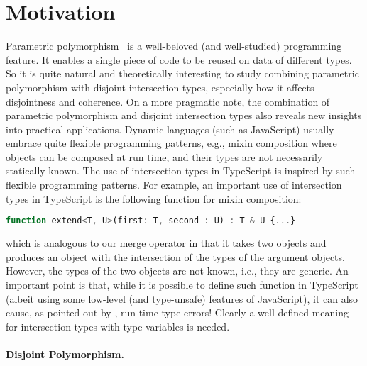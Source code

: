 
\section{Motivation}

Parametric polymorphism~\citep{reynolds1983types} is a well-beloved (and
well-studied) programming feature. It enables a single piece of code to be
reused on data of different types. So it is quite natural and theoretically
interesting to study combining parametric polymorphism with disjoint
intersection types, especially how it affects disjointness and coherence. On a more
pragmatic note, the combination of parametric polymorphism and disjoint intersection types also reveals new
insights into practical applications. Dynamic languages (such as JavaScript)
usually embrace quite flexible programming patterns, e.g., mixin composition
where objects can be composed at run time, and their types are not necessarily
statically known. The use of intersection types in TypeScript is inspired by
such flexible programming patterns. For example, an important use of
intersection types in TypeScript is the following function for mixin
composition:
\begin{lstlisting}[language=JavaScript]
function extend<T, U>(first: T, second : U) : T & U {...}
\end{lstlisting}
which is analogous to our merge operator in that it takes two objects and
produces an object with the intersection of the types of the argument objects.
However, the types of the two objects are not known, i.e., they are generic. An
important point is that, while it is possible to define such function in
TypeScript (albeit using some low-level (and type-unsafe) features of
JavaScript), it can also cause, as pointed out by \citet{alpuimdisjoint},
run-time type errors! Clearly a well-defined meaning for intersection types with
type variables is needed.


\paragraph{Disjoint Polymorphism.}

